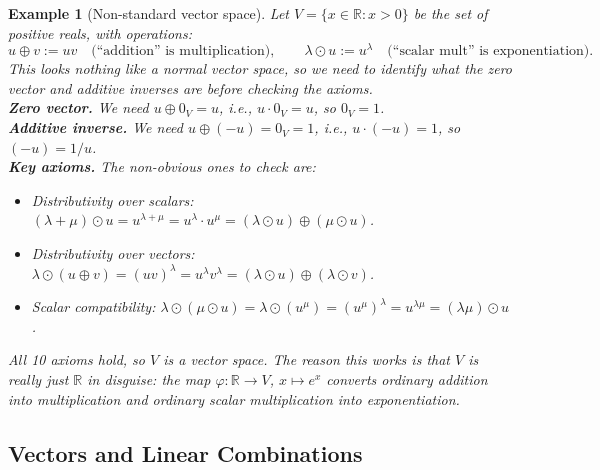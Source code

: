\documentclass{article}
\newtheorem*{example}{Example}
\begin{document}
\begin{example}[Non-standard vector space]
    Let $V = \{x \in \mathbb{R} : x > 0\}$ be the set of positive reals, with operations:
    \[u \oplus v := uv \quad \text{(``addition'' is multiplication)}, \qquad \lambda \odot u := u^\lambda \quad \text{(``scalar mult'' is exponentiation)}.\]
    This looks nothing like a normal vector space, so we need to identify what the zero vector and additive inverses are before checking the axioms.\\
    \textbf{Zero vector.} We need $u \oplus 0_V = u$, i.e., $u \cdot 0_V = u$, so $0_V = 1$.\\
    \textbf{Additive inverse.} We need $u \oplus (-u) = 0_V = 1$, i.e., $u \cdot (-u) = 1$, so $(-u) = 1/u$.\\
    \textbf{Key axioms.} The non-obvious ones to check are:
    \begin{itemize}
        \item \textit{Distributivity over scalars}: $(\lambda+\mu) \odot u = u^{\lambda+\mu} = u^\lambda \cdot u^\mu = (\lambda \odot u)\oplus(\mu \odot u)$. \checkmark
        \item \textit{Distributivity over vectors}: $\lambda \odot (u \oplus v) = (uv)^\lambda = u^\lambda v^\lambda = (\lambda\odot u)\oplus(\lambda\odot v)$. \checkmark
        \item \textit{Scalar compatibility}: $\lambda \odot (\mu \odot u) = \lambda \odot (u^\mu) = (u^\mu)^\lambda = u^{\lambda\mu} = (\lambda\mu)\odot u$. \checkmark
    \end{itemize}
    All 10 axioms hold, so $V$ is a vector space. The reason this works is that $V$ is really just $\mathbb{R}$ in disguise: the map $\varphi: \mathbb{R} \to V$, $x \mapsto e^x$ converts ordinary addition into multiplication and ordinary scalar multiplication into exponentiation.
\end{example}

\subsection{Vectors and Linear Combinations}
\end{document}
